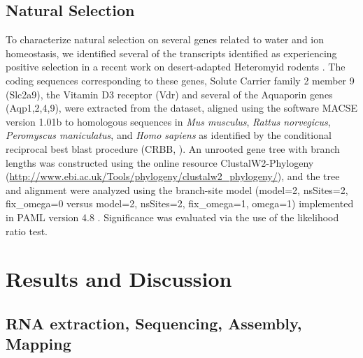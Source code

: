 \documentclass[12pt]{article}
\begin{document}
\subsection*{Natural Selection}

To characterize natural selection on several genes related to water and ion homeostasis, we identified several of the transcripts identified as experiencing positive selection in a recent work on desert-adapted Heteromyid rodents \citep{Marra:2014de}. The coding sequences corresponding to these genes, Solute Carrier family 2 member 9  (Slc2a9), the Vitamin D3 receptor (Vdr) and several of the Aquaporin genes (Aqp1,2,4,9), were extracted from the dataset, aligned using the software MACSE version 1.01b \citep{Ranwez:2011kj} to homologous sequences in \textit{Mus musculus}, \textit{Rattus norvegicus}, \textit{Peromyscus maniculatus}, and \textit{Homo sapiens} as identified by the conditional reciprocal best blast procedure (CRBB, \citep{Aubry:2014en}). An unrooted gene tree with branch lengths was constructed using the online resource ClustalW2-Phylogeny (\url{http://www.ebi.ac.uk/Tools/phylogeny/clustalw2_phylogeny/}), and the tree and alignment were analyzed using the branch-site model (model=2, nsSites=2, fix\_omega=0 versus model=2, nsSites=2, fix\_omega=1, omega=1)  implemented in PAML version 4.8 \citep{Yang:2011bm,Yang:2007ki}. Significance was evaluated via the use of the likelihood ratio test. \\   


\section*{Results and Discussion}

\subsection*{RNA extraction, Sequencing, Assembly, Mapping}
\end{document}
